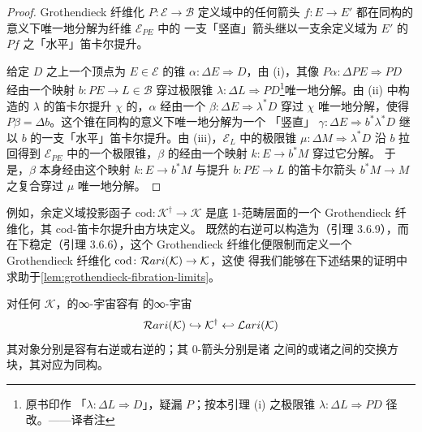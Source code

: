 \begin{proof}
Grothendieck 纤维化 $P\colon\mathcal{E}\to\mathcal{B}$ 定义域中的任何箭头
$f\colon E\to E'$ 都在同构的意义下唯一地分解为纤维 $\mathcal{E}_{PE}$ 中的
一支「竖直」箭头继以一支余定义域为 $E'$ 的 $Pf$ 之「水平」笛卡尔提升。

给定 $D$ 之上一个顶点为 $E\in\mathcal{E}$ 的锥
$\alpha\colon\Delta E\Rightarrow D$，由 (i)，其像
$P\alpha\colon\Delta PE\Rightarrow PD$ 经由一个映射 $b\colon PE\to L\in\mathcal{B}$
穿过极限锥 $\lambda\colon\Delta L\Rightarrow PD$\footnote{原书印作
「$\lambda\colon\Delta L\Rightarrow D$」，疑漏 $P$；按本引理 (i) 之极限锥
$\lambda\colon\Delta L\Rightarrow PD$ 径改。——译者注}唯一地分解。由 (ii) 中构造的
$\lambda$ 的笛卡尔提升 $\chi$ 的\trUniversalProperty{}，$\alpha$ 经由一个%
\trNaturalTransformation{} $\beta\colon\Delta E\Rightarrow\lambda^{*}D$ 穿过 $\chi$
唯一地分解，使得 $P\beta=\Delta b$。这个锥在同构的意义下唯一地分解为一个
「竖直」\trNaturalTransformation{} $\gamma\colon\Delta E\Rightarrow b^{*}\lambda^{*}D$
继以 $b$ 的一支「水平」笛卡尔提升。由 (iii)，$\mathcal{E}_{L}$ 中的极限锥
$\mu\colon\Delta M\Rightarrow\lambda^{*}D$ 沿 $b$ 拉回得到 $\mathcal{E}_{PE}$
中的一个极限锥，$\beta$ 的\trPullback{}经由一个映射 $k\colon E\to b^{*}M$ 穿过它分解。
于是，$\beta$ 本身经由这个映射 $k\colon E\to b^{*}M$ 与提升 $b\colon PE\to L$
的笛卡尔箭头 $b^{*}M\to M$ 之复合穿过 $\mu$ 唯一地分解。
\end{proof}

例如，余定义域投影函子 $\mathrm{cod}\colon\mathcal{K}^{\dagger}\to\mathcal{K}$
是底 1-范畴层面的一个 Grothendieck 纤维化，其 cod-笛卡尔提升由\trPullback{}方块定义。
既然\trIsofibration{}的\trRightAdjoint{}右逆可以构造为\trFiberedAdjunction（引理 3.6.9），而\trFiberedAdjunction{}%
在\trPullback{}下稳定（引理 3.6.6），这个 Grothendieck 纤维化便限制而定义一个
Grothendieck 纤维化 $\mathrm{cod}\colon\mathcal{R}ari(\mathcal{K})\to\mathcal{K}$，这使
得我们能够在下述结果的证明中求助于\cref{lem:grothendieck-fibration-limits}。

\begin{proposition}\label{prop:rari-lari-cosmoi}
对任何\trInfinityCosmos{} $\mathcal{K}$，\trIsofibration{}的∞-宇宙容有%
\trCosmologicalEmbedding{}的∞-宇宙
\[
\mathcal{R}ari(\mathcal{K})\hookrightarrow\mathcal{K}^{\dagger}
\hookleftarrow\mathcal{L}ari(\mathcal{K})
\]
其对象分别是容有\trRightAdjoint{}右逆或\trLeftAdjoint{}右逆的\trIsofibration{}；其 0-箭头分别是诸%
\trRightAdjoint{}之间的或诸\trLeftAdjoint{}之间的交换方块，其对应为同构。
\end{proposition}

